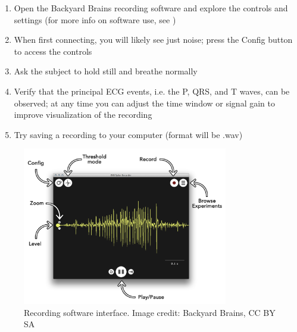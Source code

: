 \documentclass[12pt]{article}
\begin{document}
\begin{enumerate}
    \item Open the Backyard Brains recording software and explore the controls and settings (for more info on software use, see \cite{spikeRecorder})
    \item When first connecting, you will likely see just noise; press the Config button to access the controls
    \item Ask the subject to hold still and breathe normally
    \item Verify that the principal ECG events, i.e. the P, QRS, and T waves, can be observed; at any time you can adjust the time window or signal gain to improve visualization of the recording
    \item Try saving a recording to your computer (format will be .wav)
\end{enumerate}

\begin{figure}[h!]
\centering
\includegraphics[width=0.8\textwidth]{figures/BBrecorder.png}
\caption{Recording software interface. Image credit: Backyard Brains, CC BY SA}
\label{fig:recorder}
\end{figure}
\end{document}
